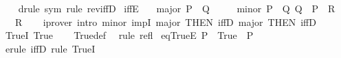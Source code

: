 \begin{isabellebody}
%
\isadelimproof
\ \ %
\endisadelimproof
%
\isatagproof
{}\isamarkupfalse%
\ {\isacharparenleft}{\kern0pt}drule\ sym{\isacharparenright}{\kern0pt}\ {\isacharparenleft}{\kern0pt}rule\ rev{\isacharunderscore}{\kern0pt}iffD{}{\isacharparenright}{\kern0pt}%
\endisatagproof
{\isafoldproof}%
%
\isadelimproof
\isanewline
%
\endisadelimproof
\isanewline
{}\isamarkupfalse%
\ iffE{\isacharcolon}{\kern0pt}\isanewline
\ \ \ major{\isacharcolon}{\kern0pt}\ {\isachardoublequoteopen}P\ {\isacharequal}{\kern0pt}\ Q{\isachardoublequoteclose}\isanewline
\ \ \ \ \ minor{\isacharcolon}{\kern0pt}\ {\isachardoublequoteopen}{\isasymlbrakk}P\ {\isasymlongrightarrow}\ Q{\isacharsemicolon}{\kern0pt}\ Q\ {\isasymlongrightarrow}\ P{\isasymrbrakk}\ {\isasymLongrightarrow}\ R{\isachardoublequoteclose}\isanewline
\ \ \ R\isanewline
%
\isadelimproof
\ \ %
\endisadelimproof
%
\isatagproof
{}\isamarkupfalse%
\ {\isacharparenleft}{\kern0pt}iprover\ intro{\isacharcolon}{\kern0pt}\ minor\ impI\ major\ {\isacharbrackleft}{\kern0pt}THEN\ iffD{}{\isacharbrackright}{\kern0pt}\ major\ {\isacharbrackleft}{\kern0pt}THEN\ iffD{}{\isacharbrackright}{\kern0pt}{\isacharparenright}{\kern0pt}%
\endisatagproof
{\isafoldproof}%
%
\isadelimproof
%
\endisadelimproof
%
\isadelimdocument
%
\endisadelimdocument
%
\isatagdocument
%
\isamarkuptrue%
%
\endisatagdocument
{\isafolddocument}%
%
\isadelimdocument
%
\endisadelimdocument
{}\isamarkupfalse%
\ TrueI{\isacharcolon}{\kern0pt}\ True\isanewline
%
\isadelimproof
\ \ %
\endisadelimproof
%
\isatagproof
{}\isamarkupfalse%
\ True{\isacharunderscore}{\kern0pt}def\ \isamarkupfalse%
\ {\isacharparenleft}{\kern0pt}rule\ refl{\isacharparenright}{\kern0pt}%
\endisatagproof
{\isafoldproof}%
%
\isadelimproof
\isanewline
%
\endisadelimproof
\isanewline
{}\isamarkupfalse%
\ eqTrueE{\isacharcolon}{\kern0pt}\ {\isachardoublequoteopen}P\ {\isacharequal}{\kern0pt}\ True\ {\isasymLongrightarrow}\ P{\isachardoublequoteclose}\isanewline
%
\isadelimproof
\ \ %
\endisadelimproof
%
\isatagproof
{}\isamarkupfalse%
\ {\isacharparenleft}{\kern0pt}erule\ iffD{}{\isacharparenright}{\kern0pt}\ {\isacharparenleft}{\kern0pt}rule\ TrueI{\isacharparenright}{\kern0pt}%
\endisatagproof
{\isafoldproof}%
%
\isadelimproof
%
\endisadelimproof
%
\isadelimdocument
%
\endisadelimdocument
%
\isatagdocument
%
\end{isabellebody}
